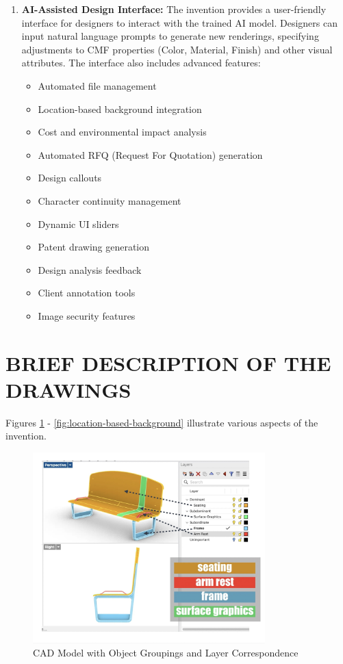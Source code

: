\documentclass[12pt]{article}
\begin{document}
\begin{enumerate}
    \item \textbf{AI-Assisted Design Interface:} The invention provides a user-friendly interface for designers to interact with the trained AI model. Designers can input natural language prompts to generate new renderings, specifying adjustments to CMF properties (Color, Material, Finish) and other visual attributes. The interface also includes advanced features:
        \begin{itemize}
            \item Automated file management
            \item Location-based background integration 
            \item Cost and environmental impact analysis 
            \item Automated RFQ (Request For Quotation) generation
            \item Design callouts
            \item Character continuity management
            \item Dynamic UI sliders
            \item Patent drawing generation
            \item Design analysis feedback
            \item Client annotation tools
            \item Image security features
        \end{itemize}
\end{enumerate}

\section{BRIEF DESCRIPTION OF THE DRAWINGS}
Figures \ref{fig:cad_model_groupings} - \ref{fig:location-based-background} illustrate various aspects of the invention.

\begin{figure}[h]
    \centering
    \includegraphics[width=0.8\textwidth]{figures/figure-perspective-right-layers-colors-labled-arrows-2.jpg}
    \caption{CAD Model with Object Groupings and Layer Correspondence}
    \label{fig:cad_model_groupings}
\end{figure}
\end{document}
